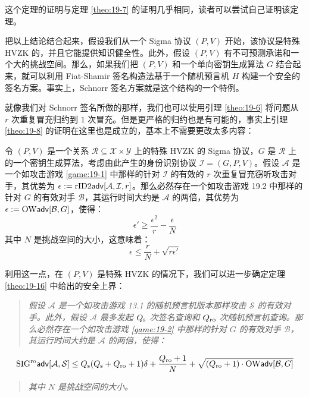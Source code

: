 这个定理的证明与定理 \ref{theo:19-7} 的证明几乎相同，读者可以尝试自己证明该定理。

把以上结论结合起来，假设我们从一个 Sigma 协议 $(P, V)$ 开始，该协议是特殊 HVZK 的，并且它能提供知识健全性。此外，假设 $(P, V)$ 有不可预测承诺和一个大的挑战空间。那么，如果我们把 $(P, V)$ 和一个单向密钥生成算法 $G$ 结合起来，就可以利用 Fiat-Shamir 签名构造法基于一个随机预言机 $H$ 构建一个安全的签名方案。事实上，Schnorr 签名方案就是这个结构的一个特例。

就像我们对 Schnorr 签名所做的那样，我们也可以使用引理 \ref{theo:19-6} 将问题从 $r$ 次重复冒充归约到 $1$ 次冒充。但是更严格的归约也是有可能的，事实上引理 \ref{theo:19-8} 的证明在这里也是成立的，基本上不需要更改太多内容：

\begin{lemma}\label{theo:19-17}
令 $(P,V)$ 是一个关系 $\mathcal{R}\subseteq\mathcal{X}×\mathcal{Y}$ 上的特殊 HVZK 的 Sigma 协议，$G$ 是 $\mathcal{R}$ 上的一个密钥生成算法，考虑由此产生的身份识别协议 $\mathcal{I}=(G,P,V)$。假设 $\mathcal{A}$ 是一个如攻击游戏 \ref{game:19-1} 中那样的针对 $\mathcal{I}$ 的有效的 $r$ 次重复冒充窃听攻击对手，其优势为 $\epsilon:={\rm rID2\mathsf{adv}}[\mathcal{A},\mathcal{I},r]$。那么必然存在一个如攻击游戏 19.2 中那样的针对 $G$ 的有效对手 $\mathcal{B}$，其运行时间大约是 $\mathcal{A}$ 的两倍，其优势为 $\epsilon:={\rm OW\mathsf{adv}}[\mathcal{B},G]$，使得：
\begin{equation}
\epsilon'\geq\frac{\epsilon^2}{r}-\frac{\epsilon}{N}
\end{equation}
其中 $N$ 是挑战空间的大小，这意味着：
\begin{equation}\label{eq:19-20}
\epsilon\leq\frac{r}{N}+\sqrt{r\epsilon'}
\end{equation}
\end{lemma}

利用这一点，在 $(P, V )$ 是特殊 HVZK 的情况下，我们可以进一步确定定理 \ref{theo:19-16} 中给出的安全上界：

\begin{quote}
\emph{假设 $\mathcal{A}$ 是一个如攻击游戏 13.1 的随机预言机版本那样攻击 $\mathcal{S}$ 的有效对手。此外，假设 $\mathcal{A}$ 最多发起 $Q_{\rm s}$ 次签名查询和 $Q_{\rm ro}$ 次随机预言机查询。那么必然存在一个如攻击游戏 \ref{game:19-2} 中那样的针对 $G$ 的有效对手 $\mathcal{B}$，其运行时间大约是 $\mathcal{A}$ 的两倍，使得：}
\end{quote}
\begin{equation}
{\rm SIG^{ro}\mathsf{adv}}[\mathcal{A},\mathcal{S}]\leq Q_{\rm s}(Q_{\rm s}+Q_{\rm ro}+1)\delta+\frac{Q_{\rm ro}+1}{N}+\sqrt{(Q_{\rm ro}+1)\cdot{\rm OW\mathsf{adv}}[\mathcal{B},G]}
\end{equation}
\begin{quote}
\emph{其中 $N$ 是挑战空间的大小。}
\end{quote}

